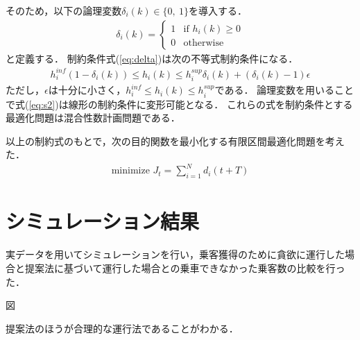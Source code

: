 \documentclass[a4j,10pt,twocolumn]{paper}
\begin{document}
そのため，以下の論理変数$\delta_i(k) \in \{ 0,\ 1\}$を導入する．
\begin{align}
 \delta_i(k)=
\left\{ \begin{array}{ll}
1 & \mbox{if }h_i(k)\geq 0 \\
0 & \mbox{otherwise}
\end{array} \right. \label{eq:delta}
\end{align}
と定義する．
制約条件式(\ref{eq:delta})は次の不等式制約条件になる．
\begin{align}
 h^{inf}_{i}(1-\delta_i(k))\leq h_i(k) \leq h^{sup}_{i} \delta_i(k)+(\delta_i(k) -1) \epsilon \label{eq:delta_new}
\end{align}
ただし，$\epsilon$は十分に小さく，$h^{inf}_{i}\leq h_i(k)\leq h^{sup}_{i}$である．
論理変数を用いることで式(\ref{eq:s2})は線形の制約条件に変形可能となる．
これらの式を制約条件とする最適化問題は混合性数計画問題である．

以上の制約式のもとで，次の目的関数を最小化する有限区間最適化問題を考えた．
\begin{align}
\mbox{minimize }J_t=\sum_{i=1}^{N}d_i(t+T) \label{eq:ob_function}
\end{align}


\section{シミュレーション結果}
実データを用いてシミュレーションを行い，乗客獲得のために貪欲に運行した場合と提案法に基づいて運行した場合との乗車できなかった乗客数の比較を行った．

図

提案法のほうが合理的な運行法であることがわかる．
%
%
\newpage
\pagebreak
\end{document}
